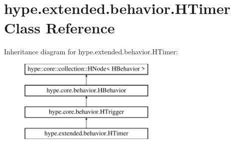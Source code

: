 \hypertarget{classhype_1_1extended_1_1behavior_1_1_h_timer}{\section{hype.\-extended.\-behavior.\-H\-Timer Class Reference}
\label{classhype_1_1extended_1_1behavior_1_1_h_timer}
}
Inheritance diagram for hype.\-extended.\-behavior.\-H\-Timer\-:\begin{figure}[H]
\begin{center}
\leavevmode
\includegraphics[height=4.000000cm]{classhype_1_1extended_1_1behavior_1_1_h_timer}
\end{center}
\end{figure}
